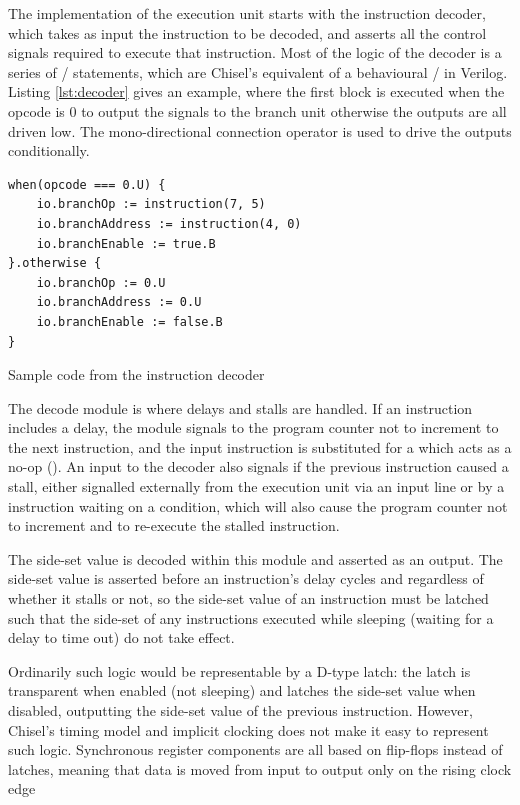 The implementation of the execution unit starts with the instruction decoder, which takes as input the instruction to be decoded, and asserts all the control signals required to execute that instruction. Most of the logic of the decoder is a series of / statements, which are Chisel's equivalent of a behavioural / in Verilog. Listing \ref{lst:decoder} gives an example, where the first block is executed when the opcode is 0 to output the signals to the branch unit otherwise the outputs are all driven low. The mono-directional connection operator \txt{:=} is used to drive the outputs conditionally.

\begin{listing}[h!]
    \vspace{0.5cm}
    \begin{verbatim}
when(opcode === 0.U) {
    io.branchOp := instruction(7, 5)
    io.branchAddress := instruction(4, 0)
    io.branchEnable := true.B
}.otherwise {
    io.branchOp := 0.U
    io.branchAddress := 0.U
    io.branchEnable := false.B
}
    \end{verbatim}
    \caption{Sample code from the instruction decoder}
    \label{lst:decoder}
\end{listing}

The decode module is where delays and stalls are handled. If an instruction includes a delay, the module signals to the program counter not to increment to the next instruction, and the input instruction is substituted for a  which acts as a no-op (). An input to the decoder also signals if the previous instruction caused a stall, either signalled externally from the execution unit via an input line or by a  instruction waiting on a condition, which will also cause the program counter not to increment and to re-execute the stalled instruction.

The side-set value is decoded within this module and asserted as an output. The side-set value is asserted before an instruction's delay cycles and regardless of whether it stalls or not, so the side-set value of an instruction must be latched such that the side-set of any  instructions executed while sleeping (waiting for a delay to time out) do not take effect.

Ordinarily such logic would be representable by a D-type latch: the latch is transparent when enabled (not sleeping) and latches the side-set value when disabled, outputting the side-set value of the previous instruction. However, Chisel's timing model and implicit clocking does not make it easy to represent such logic. Synchronous register components are all based on flip-flops instead of latches, meaning that data is moved from input to output only on the rising clock edge

